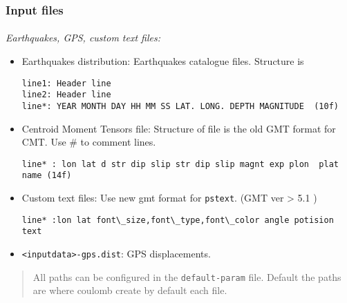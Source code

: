 \begin{frame}[t,fragile]
  \frametitle{Input files}
  \framesubtitle{}
  \label{ch2fr:inputgen}
\emph{Earthquakes, GPS, custom text files:}

\begin{itemize}
\item
  Earthquakes distribution: Earthquakes catalogue files. Structure is

\begin{verbatim}
line1: Header line
line2: Header line
line*: YEAR MONTH DAY HH MM SS LAT. LONG. DEPTH MAGNITUDE  (10f)
\end{verbatim}
\item
  Centroid Moment Tensors file: Structure of file is the old GMT format
  for CMT. Use \# to comment lines.

\begin{verbatim}
line* : lon lat d str dip slip str dip slip magnt exp plon  plat  name (14f)
\end{verbatim}
\item
  Custom text files: Use new gmt format for \texttt{pstext}. (GMT ver
  \textgreater{} 5.1 )

\begin{verbatim}
line* :lon lat font\_size,font\_type,font\_color angle potision text
\end{verbatim}
\item
  \texttt{\textless{}inputdata\textgreater{}-gps.dist}: GPS
  displacements.
\end{itemize}

\begin{quote}
All paths can be configured in the \texttt{default-param} file. Default
the paths are where coulomb create by default each file.
\end{quote}

\end{frame}
\note{} %














